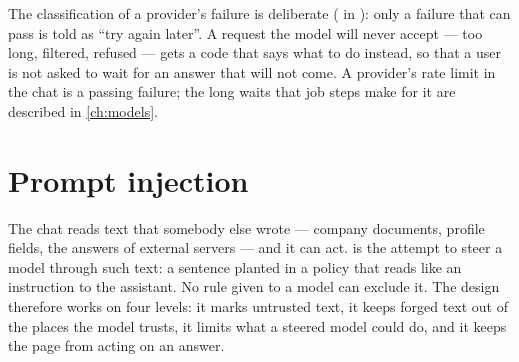 The classification of a provider's failure is deliberate ( in
): only a failure that can pass is told as \enquote{try again
later}. A request the model will never accept --- too long, filtered, refused --- gets a code
that says what to do instead, so that a user is not asked to wait for an answer that will not
come. A provider's rate limit in the chat is a passing failure; the long waits that job steps
make for it are described in \cref{ch:models}.


\section{Prompt injection}\label{sec:chat:injection}

The chat reads text that somebody else wrote --- company documents, profile fields, the
answers of external servers --- and it can act.  is the attempt to
steer a model through such text: a sentence planted in a policy that reads like an instruction
to the assistant. No rule given to a model can exclude it. The design therefore works on four
levels: it marks untrusted text, it keeps forged text out of the places the model trusts,
it limits what a steered model could do, and it keeps the page from acting on an answer.

